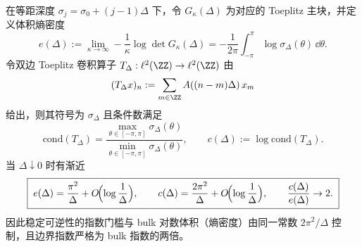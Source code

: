 %

\begin{corollary}\label{cor:xi-hellinger-toeplitz-dense-2x-law}
在等距深度 \(\sigma_j=\sigma_0+(j-1)\Delta\) 下，令 \(G_\kappa(\Delta)\) 为对应的 Toeplitz 主块，并定义体积熵密度
\[
e(\Delta):=\lim_{\kappa\to\infty}-\frac1\kappa\log\det G_\kappa(\Delta)
=-\frac{1}{2\pi}\int_{-\pi}^{\pi}\log\sigma_\Delta(\theta)\,\dd\theta.
\]
令双边 Toeplitz 卷积算子 \(T_\Delta:\ell^2(\ZZ)\to\ell^2(\ZZ)\) 由
\[
(T_\Delta x)_n:=\sum_{m\in\ZZ}A((n-m)\Delta)\,x_m
\]
给出，则其符号为 \(\sigma_\Delta\) 且条件数满足
\[
\mathrm{cond}(T_\Delta)=\frac{\max_{\theta\in[-\pi,\pi]}\sigma_\Delta(\theta)}{\min_{\theta\in[-\pi,\pi]}\sigma_\Delta(\theta)},
\qquad
c(\Delta):=\log\mathrm{cond}(T_\Delta).
\]
当 \(\Delta\downarrow0\) 时有渐近
\[
\boxed{\;
e(\Delta)=\frac{\pi^2}{\Delta}+O\!\Bigl(\log\frac1\Delta\Bigr),\qquad
c(\Delta)=\frac{2\pi^2}{\Delta}+O\!\Bigl(\log\frac1\Delta\Bigr),\qquad
\frac{c(\Delta)}{e(\Delta)}\to 2.\;}
\]
因此稳定可逆性的指数门槛与 bulk 对数体积（熵密度）由同一常数 \(2\pi^2/\Delta\) 控制，且边界指数严格为 bulk 指数的两倍。
\end{corollary}
